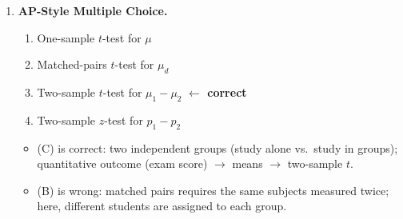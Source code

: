 \documentclass[10pt]{article}
\begin{document}
\begin{enumerate}
      \begin{enumerate}[label=\alph*.]
        \item \textbf{State:} Procedure: \\
              $H_0$:  \quad $H_a$: 
              \quad ($\mu_d$ = mean difference in sprint time, before $-$ after)
        \item \textbf{Plan:} Conditions: Random:  \quad Normal: 
        \item \textbf{Do:} $t = \dfrac{\bar d - 0}{s_d / \sqrt{n}} = \dfrac{0.31}{0.18/\sqrt{10}} \approx$  \quad
              $p$-value $\approx$  ($df =$ )
        \item \textbf{Conclude:} 
      \end{enumerate}

\vspace{0.10in}

\item \textbf{AP-Style Multiple Choice.}

      \begin{enumerate}[label=(\Alph*)]
        \item One-sample $t$-test for $\mu$
        \item Matched-pairs $t$-test for $\mu_d$
        \item Two-sample $t$-test for $\mu_1 - \mu_2$ \textcolor{keyred}{\textbf{$\leftarrow$ correct}}
        \item Two-sample $z$-test for $p_1 - p_2$
      \end{enumerate}
      \begin{itemize}
        \item (C) is correct: two independent groups (study alone vs.\ study in groups); quantitative outcome (exam score) $\to$ means $\to$ two-sample $t$.
        \item (B) is wrong: matched pairs requires the same subjects measured twice; here, different students are assigned to each group.
      \end{itemize}

\end{enumerate}
\end{document}

